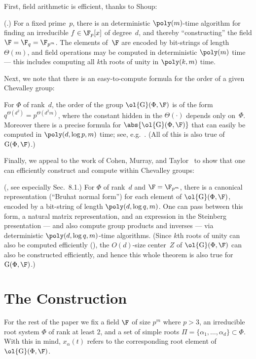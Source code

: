 \documentclass[11pt]{article}
\newcommand{\Esc}[2]{\ol{\mathrm{G}}(#1,#2)}
\newcommand{\Gu}[2]{\ol{\mathrm{G}}(#1,#2)}
\newcommand{\Gad}[2]{\mathrm{G}(#1,#2)}
\begin{document}
First, field arithmetic is efficient, thanks to Shoup:
\begin{theorem}                                     \label{thm:fields}
    \textnormal{(\cite{Sho90}.)}
    For a fixed prime~$p$, there is an deterministic $\poly(m)$-time algorithm for finding an irreducible $f \in \F_p[x]$ of degree~$d$, and thereby ``constructing'' the field $\F = \F_q = \F_{p^m}$.
    The elements of~$\F$ are encoded by bit-strings of length~$\Theta(m)$, and field operations may be computed in deterministic $\poly(m)$ time --- this includes computing all $k$th roots of unity in $\poly(k,m)$ time.
\end{theorem}

Next, we note that there is an easy-to-compute formula for the order of a given Chevalley group:
\begin{theorem}                                     \label{thm:order}
    For $\Phi$ of rank~$d$, the order of the group $\Gu{\Phi}{\F}$ is of the form $q^{\Theta(d^2)} = p^{\Theta(d^2 m)}$, where the constant hidden in the $\Theta(\cdot)$ depends only on~$\Phi$.
    Moreover there is a precise formula for $\abs{\Gu{\Phi}{\F}}$ that can easily be computed in $\poly(d, \log p, m)$ time; see, e.g.~\cite[Thm.~25]{Ste16}.
    (All of this is also true of  $\Gad{\Phi}{\F}$.)
\end{theorem}

Finally, we appeal to the work of Cohen, Murray, and Taylor~\cite{CMT04} to show that one can efficiently construct and compute within Chevalley groups:
\begin{theorem}                                     \label{thm:computing}
    \textnormal{(\cite{CMT04}, see especially Sec.~8.1.)}
     For $\Phi$ of rank~$d$ and $\F = \F_{p^m}$, there is a canonical representation (``Bruhat normal form'') for each element of $\Gu{\Phi}{\F}$, encoded by a bit-string of length $\poly(d, \log q, m)$.  One can pass between this form, a natural matrix representation, and an expression in the Steinberg presentation --- and also compute group products and inverses --- via deterministic $\poly(d, \log q, m)$-time algorithms.
     (Since $k$th roots of unity can also be computed efficiently (), the $O(d)$-size center~$Z$ of $\Gu{\Phi}{\F}$ can also be constructed efficiently, and hence this whole theorem is also true for~$\Gad{\Phi}{\F}$.)
\end{theorem}


\section{The Construction}\label{sec:construct}
For the rest of the paper we fix a field $\F$ of size $p^m$ where $p > 3$, an irreducible root system $\Phi$ of rank at least $2$, and a set of simple roots $\Pi = \{\alpha_1, \dots, \alpha_d\} \subset \Phi$. With this in mind, $x_\alpha(t)$ refers to the corresponding root element of $\Esc{\Phi}{\F}$.
\end{document}
